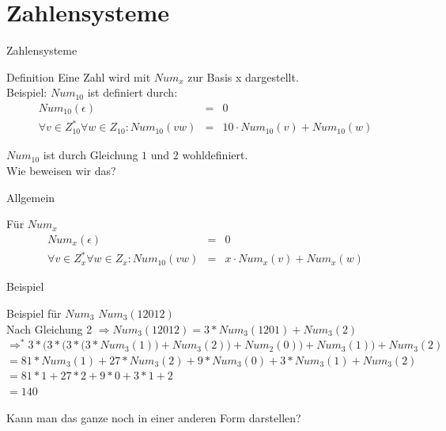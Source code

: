 	
	\section{Zahlensysteme}
	\begin{frame}{Zahlensysteme}
		\begin{block}{Definition}
			Eine Zahl wird mit $Num_x$ zur Basis x dargestellt.\\
			
			\pause
			Beispiel: $Num_{10}$ ist definiert durch:\\
			
			
			\begin{align}
			Num_{10}(\epsilon) &=& 0 \\
			\forall v \in Z_{10}^*\forall w \in Z_{10} : Num_{10}(vw) 
			&=& 10 \cdot Num_{10}(v) + Num_{10}(w)
			\end{align}
			
		\end{block}
		
		\begin{Lemma}
			$Num_{10}$ ist durch Gleichung $1$ und $2$ wohldefiniert.\\
			\pause
			Wie beweisen wir das?
		\end{Lemma}
	\end{frame}
	
	
	\begin{frame}{Allgemein}
		\begin{block}{Für $Num_x$}
			\begin{align}
			Num_{x}(\epsilon) &=& 0 \\
			\forall v \in Z_{x}^*\forall w \in Z_{x} : Num_{10}(vw) 
			&=& x \cdot Num_{x}(v) + Num_{x}(w)
			\end{align}
		\end{block}
	\end{frame}
	
		
	
	\begin{frame}{Beispiel}
		\begin{block}{Beispiel für $Num_3$}
			$Num_3(12012)$\\
		\pause
			Nach Gleichung 2 $\Rightarrow Num_3(12012) = 3*Num_3(1201) + Num_3(2)$\\
		\pause
			$\Rightarrow^* 3*\bigg(3*\Big(3*\big(3*Num_3(1) )+Num_3(2)\big)+ Num_2(0)\Big)+Num_3(1)\bigg) + Num_3(2) $\\
		\pause
			\vspace{5pt}
			$= 81* Num_3(1) + 27* Num_3(2) + 9* Num_3(0) + 3* Num_3(1) + Num_3(2)$\\
		\pause
			\vspace{5pt}
			$ = 81* 1 + 27* 2 + 9 * 0 + 3 * 1 + 2$\\
		\pause
			\vspace{5pt}
			$ = 140$
		\end{block}
		
		\pause
		Kann man das ganze noch in einer anderen Form darstellen?
	\end{frame}
	
